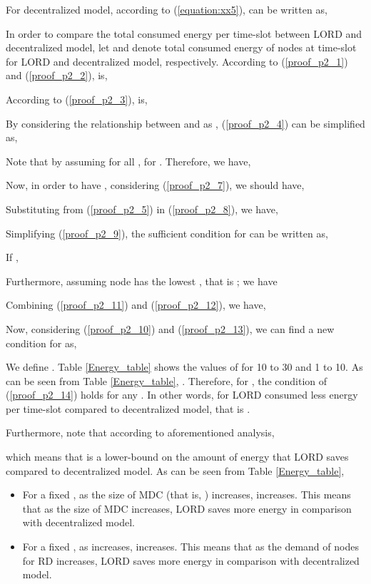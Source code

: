 \documentclass[journal,12pt, onecolumn]{IEEEtran}
\begin{document}
 
For decentralized model, according to (\ref{equation:xx5}),  can be written as,

 
In order to compare the total consumed energy per time-slot between LORD and decentralized model, let  and  denote total consumed energy of nodes at time-slot  for LORD and decentralized model, respectively. According to (\ref{proof_p2_1}) and (\ref{proof_p2_2}),  is,


According to (\ref{proof_p2_3}),  is, 


By considering the relationship between  and  as , (\ref{proof_p2_4}) can be simplified as, 
 
Note that by assuming  for all ,  for . Therefore, we have,
 
 
Now, in order to have , considering (\ref{proof_p2_7}), we should have,

 
Substituting  from (\ref{proof_p2_5}) in  (\ref{proof_p2_8}), we have,

 
Simplifying (\ref{proof_p2_9}), the sufficient condition for  can be written as,


If , 


Furthermore, assuming node  has the lowest , that is ; we have 


Combining (\ref{proof_p2_11}) and (\ref{proof_p2_12}), we have,


Now, considering  (\ref{proof_p2_10}) and (\ref{proof_p2_13}), we can find a new condition for  as,


We define . Table \ref{Energy_table} shows the values of  for  10 to 30 and  1 to 10. As can be seen from Table \ref{Energy_table}, . Therefore, for , the condition of (\ref{proof_p2_14}) holds for any . In other words,  for  LORD consumed less energy per time-slot compared to decentralized model, that is .

Furthermore, note that according to aforementioned analysis, 

which means that  is a lower-bound on the amount of energy that LORD saves compared to decentralized model. As can be seen from Table \ref{Energy_table},
\begin{itemize}
\item For a fixed , as the size of MDC (that is, ) increases,  increases. This means that as the size of MDC increases, LORD saves more energy in comparison with decentralized model.
\item For a fixed , as  increases,  increases. This means that as the demand of nodes for RD increases, LORD saves more energy in comparison with decentralized model.

\end{itemize}
\end{document}
